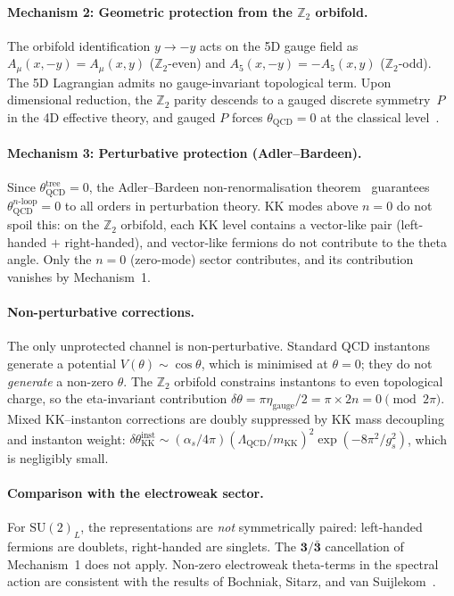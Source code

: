 \paragraph{Mechanism 2: Geometric protection from the $\mathbb{Z}_2$ orbifold.}
The orbifold identification $y \to -y$ acts on the 5D gauge field as $A_\mu(x,-y) = A_\mu(x,y)$ ($\mathbb{Z}_2$-even) and $A_5(x,-y) = -A_5(x,y)$ ($\mathbb{Z}_2$-odd).  The 5D Lagrangian admits no gauge-invariant topological term.  Upon dimensional reduction, the $\mathbb{Z}_2$ parity descends to a gauged discrete symmetry~$P$ in the 4D effective theory, and gauged $P$ forces $\theta_{\mathrm{QCD}} = 0$ at the classical level~\cite{ch4:Hook2025}.

\paragraph{Mechanism 3: Perturbative protection (Adler--Bardeen).}
Since $\theta_{\mathrm{QCD}}^{\mathrm{tree}} = 0$, the Adler--Bardeen non-renormalisation theorem~\cite{ch4:AdlerBardeen1969} guarantees $\theta_{\mathrm{QCD}}^{n\text{-loop}} = 0$ to all orders in perturbation theory.  KK modes above $n = 0$ do not spoil this: on the $\mathbb{Z}_2$ orbifold, each KK level contains a vector-like pair (left-handed $+$ right-handed), and vector-like fermions do not contribute to the theta angle.  Only the $n = 0$ (zero-mode) sector contributes, and its contribution vanishes by Mechanism~1.

\paragraph{Non-perturbative corrections.}
The only unprotected channel is non-perturbative.  Standard QCD instantons generate a potential $V(\theta) \sim \cos\theta$, which is minimised at $\theta = 0$; they do not \emph{generate} a non-zero $\theta$.  The $\mathbb{Z}_2$ orbifold constrains instantons to even topological charge, so the eta-invariant contribution $\delta\theta = \pi \eta_{\mathrm{gauge}}/2 = \pi \times 2n = 0 \pmod{2\pi}$.  Mixed KK--instanton corrections are doubly suppressed by KK mass decoupling and instanton weight: $\delta\theta_{\mathrm{KK}}^{\mathrm{inst}} \sim (\alpha_s/4\pi)(\Lambda_{\mathrm{QCD}}/m_{\mathrm{KK}})^2 \exp(-8\pi^2/g_s^2)$, which is negligibly small.

\paragraph{Comparison with the electroweak sector.}
For $\mathrm{SU}(2)_L$, the representations are \emph{not} symmetrically paired: left-handed fermions are doublets, right-handed are singlets.  The $\mathbf{3}/\bar{\mathbf{3}}$ cancellation of Mechanism~1 does not apply.  Non-zero electroweak theta-terms in the spectral action are consistent with the results of Bochniak, Sitarz, and van Suijlekom~\cite{ch4:BochniakSitarzVS2021}.

